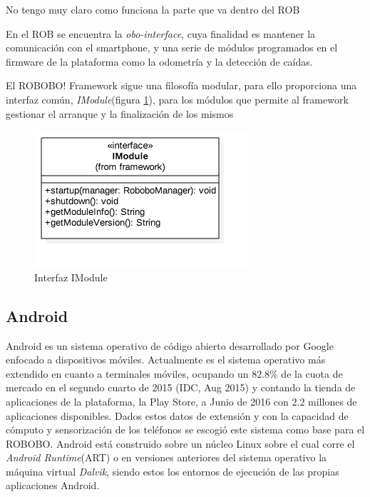 {\color{red} No tengo muy claro como funciona la parte que va dentro del ROB}

En el ROB se encuentra la \textit{obo-interface}, cuya finalidad es mantener la comunicación con el smartphone, y una serie de módulos programados en el firmware de la plataforma como la odometría y la detección de caídas.

El ROBOBO! Framework sigue una filosofía modular, para ello proporciona una interfaz común, \textit{IModule}(figura \ref{fig:imodule}), para los módulos que permite al framework gestionar el arranque y la finalización de los mismos


\begin{figure}
	\centering
	\includegraphics[width=0.7\linewidth]{imagenes/diagramas/IModule.png}
	\caption{Interfaz IModule}
	\label{fig:imodule}
\end{figure}
\subsection{Android}
\label{subsec:android}


Android es un sistema operativo de código abierto desarrollado por Google enfocado a dispositivos móviles. Actualmente es el sistema operativo más extendido en cuanto a terminales móviles, ocupando un 82.8\% de la cuota de mercado en el segundo cuarto de 2015 (IDC, Aug 2015) y contando la tienda de aplicaciones de la plataforma, la  Play Store, a Junio de 2016 con 2.2 millones de aplicaciones disponibles.
Dados estos datos de extensión y con la capacidad de cómputo y sensorización de los teléfonos se escogió este sistema como base para el ROBOBO.
Android está construido sobre un núcleo Linux sobre el cual corre el \textit{Android Runtime}(ART) o en versiones anteriores del sistema operativo la máquina virtual \textit{Dalvik}, siendo estos los entornos de ejecución de las propias aplicaciones Android.


